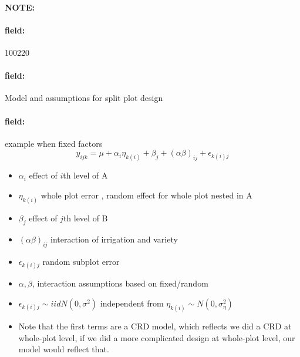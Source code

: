 \documentclass[12pt]{article}
\newenvironment{note}{\paragraph{NOTE:}}{}
\newenvironment{field}{\paragraph{field:}}{}
\begin{document}
\begin{note}
    \begin{field}
        \tiny 100220
    \end{field}
    \begin{field}
        Model and assumptions for split plot design
    \end{field}
    \begin{field}
      example when fixed factors
        $$y_{ijk} = \mu + \alpha_i \eta_{k(i)} + \beta_j + (\alpha\beta)_{ij} + \epsilon_{k(i)j} $$
        \begin{itemize}
          \item $\alpha_i$ effect of $i$th level of A
          \item $\eta_{k(i)}$ whole plot error , random effect for whole plot nested in A
          \item $\beta_j$ effect of $j$th level of B
          \item $(\alpha\beta)_{ij}$ interaction of irrigation and variety
          \item $\epsilon_{k(i)j}$ random subplot error
          \item $\alpha,\beta$, interaction assumptions based on fixed/random
          \item $\epsilon_{k(i)j} \sim iid N(0,\sigma^2)$ independent from $\eta_{k(i)} \sim N(0,\sigma_{\eta}^2)$
          \item Note that the first terms are a CRD model, which reflects we did a CRD at whole-plot level, if we did a more complicated design at whole-plot level, our model would reflect that.
        \end{itemize}
    \end{field}
\end{note}
\end{document}
